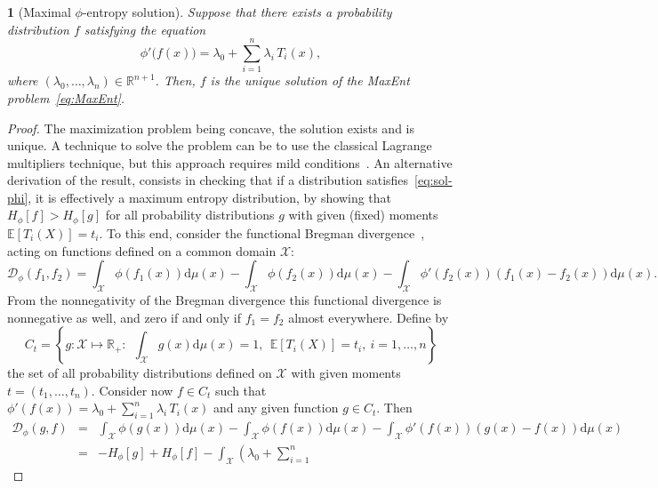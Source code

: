 \documentclass[english,sort&compress]{elsarticle}
\theoremstyle{definition}
\theoremstyle{plain}
\newtheorem{prop}{\protect\propositionname}
\theoremstyle{plain}
\providecommand{\propositionname}{Proposition}
\def\dmu{\mathrm{d}\mu}
\def\fD{\mathcal{D}}
\def\Rset{\mathbb{R}}
\def\X{\mathcal{X}}
\newcommand{\Esp}[1]{\mathbb{E}\left[ #1 \right]}
\begin{document}
\begin{prop}[Maximal $\phi$-entropy solution]\label{prop:sol-phi}
  Suppose  that  there exists  a  probability  distribution  $f$ satisfying  the
  equation
  \begin{equation}\label{eq:sol-phi}
    \phi'\big(f(x)\big) = \lambda_0 + \sum_{i=1}^n \lambda_i \, T_i(x),
  \end{equation}
  where $(\lambda_0,\ldots,\lambda_n) \in \Rset^{n+1}$.  Then, $f$ is the unique
  solution of the MaxEnt problem~\eqref{eq:MaxEnt}.
\end{prop}
%
\begin{proof}
  The maximization problem  being concave, the solution exists  and is unique. A
  technique  to  solve  the  problem  can  be  to  use  the  classical  Lagrange
  multipliers     technique,     but     this     approach     requires     mild
  conditions~\cite{BorLew91:03, BorLew93,  BenBor92}.  An alternative derivation
  of   the    result,   consists   in   checking   that    if   a   distribution
  satisfies~\eqref{eq:sol-phi},   it   is    effectively   a   maximum   entropy
  distribution,  by showing  that $H_\phi[f]  > H_\phi[g]$  for  all probability
  distributions $g$  with given (fixed)  moments $\Esp{T_i(X)} = t_i$.   To this
  end,  consider  the  functional  Bregman  divergence~\cite{Bas13},  acting  on
  functions defined on a common domain $\X$:
  \begin{equation}
  \label{eq:FctBregman}
  \fD_\phi(f_1,f_2)  =  \int_\X  \phi(f_1(x))  \dmu(x)  -  \int_\X  \phi(f_2(x))
  \dmu(x) - \int_\X \phi'(f_2(x)) \left( f_1(x) - f_2(x) \right) \dmu(x).
  \end{equation}
  From the nonnegativity of the Bregman divergence this functional divergence is
  nonnegative  as   well,  and  zero  if   and  only  if  $f_1   =  f_2$  almost
  everywhere. Define by
  \[
  C_t =  \left\{ g: \X  \mapsto \Rset_+  : \:\: \int_\X  g(x) \dmu(x) =  1, \:\:
    \Esp{T_i(X)} = t_i, \: i = 1, \ldots , n \right\}
  \]
  the set of all probability distributions defined on $\X$ with given moments $t
  =  (t_1,\ldots,t_n)$.  Consider  now  $f  \in C_t$  such  that $\phi'(f(x))  =
  {\displaystyle \lambda_0  + \sum_{i=1}^n \lambda_i  \, T_i(x)}$ and  any given
  function $g \in C_t$. Then
  \begin{eqnarray*}
  \fD_\phi(g,f) & = & \int_\X \phi(g(x)) \dmu(x) - \int_\X \phi(f(x)) \dmu(x) -
  \int_\X \phi'(f(x)) \left( g(x) - f(x) \right) \dmu(x)
  \\[2mm]
  & = & - H_\phi[g] + H_\phi[f] - \int_\X \left( \lambda_0 + \sum_{i=1}^n

\end{eqnarray*}
\end{proof}
\end{document}
